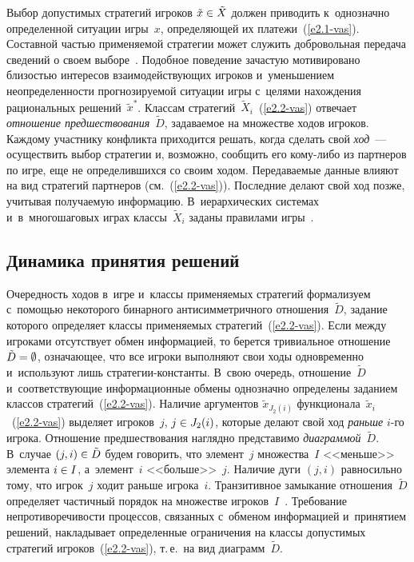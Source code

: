\begin{multicols}{2}
    Выбор допустимых стратегий игроков $\tilde{x}\hm\in \tilde{X}$ должен
приводить к~однозначно определенной ситуации игры~$x$, определяющей их
платежи~(\ref{e2.1-vas}). Состав\-ной частью применяемой стратегии может служить
добровольная передача сведений о своем выборе~\cite{1-vas}. Подобное поведение
зачастую мотивировано близостью интересов взаимодействующих игроков
и~уменьшением неопределенности прогнозируемой ситуации игры с~целями
нахождения рациональных решений~$\tilde{x}^*$. Классам
стратегий~$\tilde{X}_i$~(\ref{e2.2-vas}) отвечает \textit{отношение
предшествования}~$\tilde{D}$, задаваемое на множестве ходов игроков. Каждому
участнику конфликта приходится решать, когда сделать свой \textit{ход}~---
осуществить выбор стратегии и, возможно, сообщить его ко\-му-ли\-бо из партнеров
по игре, еще не определившихся со своим ходом. Переда\-ва\-емые данные влияют на
вид стратегий партнеров (см.~(\ref{e2.2-vas})). Последние делают свой ход позже,
учитывая получаемую информацию. В~иерархических системах и~в~многошаговых
играх классы~$\tilde{X}_i$ заданы правилами игры~\cite{15-vas}.

\subsection{Динамика принятия решений}

    Очередность ходов в~игре и~классы применяемых стратегий формализуем с~помощью некоторого бинарного антисимметричного отношения~$\tilde{D}$,
задание которого определяет классы применяемых стратегий~(\ref{e2.2-vas}). Если
между игроками отсутствует обмен информацией, то берется тривиальное
отношение $\tilde{D}\hm= \emptyset$, означающее, что все игроки выполняют свои
ходы одновременно и~используют лишь стра\-те\-гии-кон\-стан\-ты. В~свою
очередь, отношение~$\tilde{D}$ и~соответствующие информационные обмены
однозначно определены заданием классов стратегий~(\ref{e2.2-vas}). Наличие
аргументов $\tilde{x}_{J_2(i)}$ функционала~$\tilde{x}_i$~(\ref{e2.2-vas}) выделяет
игроков~$j$, $j\hm\in J_2(i)$, которые делают свой ход \textit{раньше} $i$-го игрока.
Отношение предшествования наглядно представимо
\textit{диаграммой}~$\tilde{D}$. В~случае $(j,i)\hm\in \tilde{D}$ будем говорить, что
элемент~$j$ множества~$I$ <<меньше>> элемента $i\hm\in I$, а~элемент~$i$
<<больше>>~$j$. Наличие дуги $(j,i)$ равносильно тому, что игрок~$j$ ходит
раньше игрока~$i$. Транзитивное замыкание отношения~$\tilde{D}$ определяет
частичный порядок на множестве игроков~$I$~\cite{16-vas}. Требование
непротиворечивости процессов, связанных с~обменом информацией и~принятием
решений, накладывает определенные ограничения на классы допустимых стратегий
игроков~(\ref{e2.2-vas}), т.\,е.\ на вид диаграмм~$\tilde{D}$.


\end{multicols}
